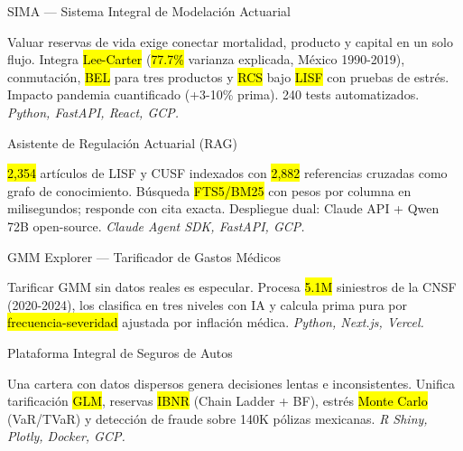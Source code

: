 \documentclass[10pt, letterpaper]{awesome-cv}
\begin{document}
\begin{cventries}

  \cventry
    {SIMA — Sistema Integral de Modelación Actuarial}
    {}
    {}
    {}
    {
      \begin{cvitems}
        \item {Valuar reservas de vida exige conectar mortalidad, producto y capital en un solo flujo. Integra \hl{Lee-Carter} (\hl{77.7\%} varianza explicada, México 1990-2019), conmutación, \hl{BEL} para tres productos y \hl{RCS} bajo \hl{LISF} con pruebas de estrés. Impacto pandemia cuantificado (+3-10\% prima). 240 tests automatizados. \textit{Python, FastAPI, React, GCP.}}
      \end{cvitems}
    }

  \cventry
    {Asistente de Regulación Actuarial (RAG)}
    {}
    {}
    {}
    {
      \begin{cvitems}
        \item {\hl{2,354} artículos de LISF y CUSF indexados con \hl{2,882} referencias cruzadas como grafo de conocimiento. Búsqueda \hl{FTS5/BM25} con pesos por columna en milisegundos; responde con cita exacta. Despliegue dual: Claude API + Qwen 72B open-source. \textit{Claude Agent SDK, FastAPI, GCP.}}
      \end{cvitems}
    }

  \cventry
    {GMM Explorer — Tarificador de Gastos Médicos}
    {}
    {}
    {}
    {
      \begin{cvitems}
        \item {Tarificar GMM sin datos reales es especular. Procesa \hl{5.1M} siniestros de la CNSF (2020-2024), los clasifica en tres niveles con IA y calcula prima pura por \hl{frecuencia-severidad} ajustada por inflación médica. \textit{Python, Next.js, Vercel.}}
      \end{cvitems}
    }

  \cventry
    {Plataforma Integral de Seguros de Autos}
    {}
    {}
    {}
    {
      \begin{cvitems}
        \item {Una cartera con datos dispersos genera decisiones lentas e inconsistentes. Unifica tarificación \hl{GLM}, reservas \hl{IBNR} (Chain Ladder + BF), estrés \hl{Monte Carlo} (VaR/TVaR) y detección de fraude sobre 140K pólizas mexicanas. \textit{R Shiny, Plotly, Docker, GCP.}}
      \end{cvitems}
    }

\end{cventries}
\end{document}
